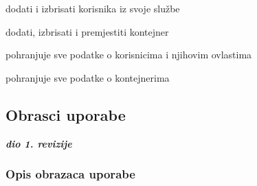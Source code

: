 \begin{packed_enum}
				\begin{packed_enum}
				
					\item dodati i izbrisati korisnika iz svoje službe
					\item dodati, izbrisati i premjestiti kontejner 				
				
				\end{packed_enum}
				
				\item	{}
				
				\begin{packed_enum}
				
					\item pohranjuje sve podatke o korisnicima i njihovim ovlastima
					\item pohranjuje sve podatke o kontejnerima 
				
				\end{packed_enum}
				
			\end{packed_enum}
			
			\eject 
			
			
				
			\subsection{Obrasci uporabe}
			
			\textbf{\textit{dio 1. revizije}}
			
			\subsubsection{Opis obrazaca uporabe}
			
